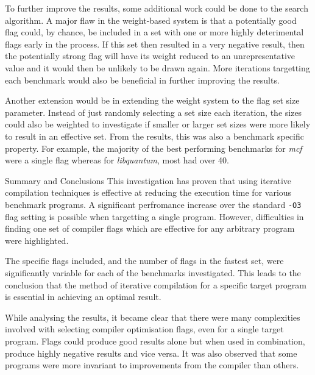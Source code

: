 \documentclass[twocolumn, 10pt]{article}
\makeatletter
\def\section{\@startsection {section}{1}{\z@}{24pt plus 2pt minus 2pt}
{12pt plus 2pt minus 2pt}{\large\bf}}
\makeatother
\begin{document}
To further improve the results, some additional work could be done to the search algorithm. A major flaw in the weight-based system is that a potentially good flag could, by chance, be included in a set with one or more highly deterimental flags early in the process. If this set then resulted in a very negative result, then the potentially strong flag will have its weight reduced to an unrepresentative value and it would then be unlikely to be drawn again.
More iterations targetting each benchmark would also be beneficial in further improving the results.

Another extension would be in extending the weight system to the flag set size parameter. Instead of just randomly selecting a set size each iteration, the sizes could also be weighted to investigate if smaller or larger set sizes were more likely to result in an effective set. From the results, this was also a benchmark specific property. For example, the majority of the best performing benchmarks for \emph{mcf} were a single flag whereas for \emph{libquantum}, most had over 40.

\section{Summary and Conclusions}
This investigation has proven that using iterative compilation techniques is effective at reducing the execution time for various benchmark programs. A significant perfromance increase over the standard \texttt{-O3} flag setting is possible when targetting a single program. However, difficulties in finding one set of compiler flags which are effective for any arbitrary program were highlighted. 

The specific flags included, and the number of flags in the fastest set, were significantly variable for each of the benchmarks investigated. This leads to the conclusion that the method of iterative compilation for a specific target program is essential in achieving an optimal result.

While analysing the results, it became clear that there were many complexities involved with selecting compiler optimisation flags, even for a single target program. Flags could produce good results alone but when used in combination, produce highly negative results and vice versa. It was also observed that some programs were more invariant to improvements from the compiler than others.
\end{document}
